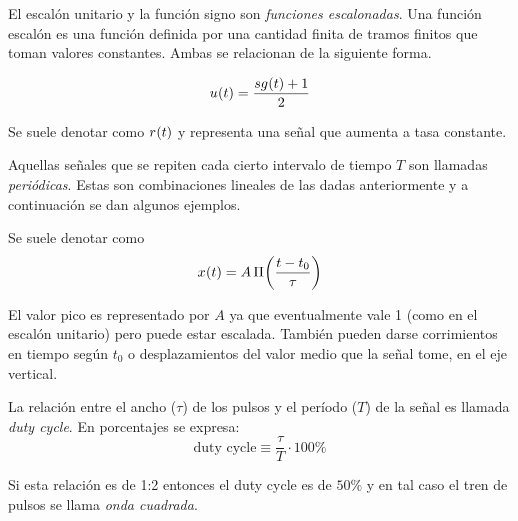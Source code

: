 El escalón unitario y la función signo son \emph{funciones escalonadas}.
Una función escalón es una función definida por una cantidad finita de tramos finitos que toman valores constantes.
Ambas se relacionan de la siguiente forma.

\begin{mdframed}[style=MyFrame1]
    \begin{prop}
    \end{prop}
    \begin{equation*}
        \fx[u]{t} = \frac{\fx[sg]{t} + 1}{2}
    \end{equation*}
\end{mdframed}


Se suele denotar como $\fx[r]{t}$ y representa una señal que aumenta a tasa constante.

\begin{center}
    \def\svgwidth{0.6\linewidth}
    
\end{center}

Aquellas señales que se repiten cada cierto intervalo de tiempo $T$ son llamadas \emph{periódicas}.
Estas son combinaciones lineales de las dadas anteriormente y a continuación se dan algunos ejemplos.


Se suele denotar como
\begin{equation*}
    \fx[x]{t} = A \, \fx[\Pi]{\frac{t-t_0}{\tau}}
\end{equation*}

\begin{center}
    \def\svgwidth{0.8\linewidth}
    
\end{center}

El valor pico es representado por $A$ ya que eventualmente vale 1 (como en el escalón unitario) pero puede estar escalada.
También pueden darse corrimientos en tiempo según $t_0$ o desplazamientos del valor medio que la señal tome, en el eje vertical.

La relación entre el ancho ($\tau$) de los pulsos y el período ($T$) de la señal es llamada \emph{duty cycle}.
En porcentajes se expresa:
\begin{equation*}
    \text{duty cycle}  \equiv \frac{\tau}{T} \cdot 100\%
\end{equation*}

Si esta relación es de 1:2 entonces el duty cycle es de $50\%$ y en tal caso el tren de pulsos se llama \emph{onda cuadrada}.

